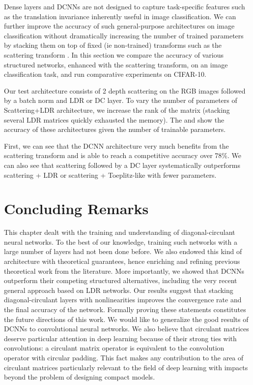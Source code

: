 Dense layers and DCNNs are not designed to capture task-specific features such as the translation invariance inherently useful in image classification.
We can further improve the accuracy of such general-purpose architectures on image classification without dramatically increasing the number of trained parameters by stacking them on top of fixed (ie non-trained) transforms such as the scattering transform \cite{mallat2010recursive}.
In this section we compare the accuracy of various structured networks, enhanced with the scattering transform, on an image classification task, and run comparative experiments on CIFAR-10. 

Our test architecture consists of 2 depth scattering on the RGB images followed by a batch norm and LDR or DC layer.
To vary the number of parameters of Scattering+LDR architecture, we increase the rank of the matrix (stacking several LDR matrices quickly exhausted the memory).
The  and  show the accuracy of these architectures given the number of trainable parameters.

First, we can see that the DCNN architecture very much benefits from the scattering transform and is able to reach a competitive accuracy over 78\%.
We can also see that scattering followed by a DC layer systematically outperforms scattering + LDR or scattering + Toeplitz-like with fewer parameters. 





\section{Concluding Remarks}
\label{section:ch4-concluding_remarks}

This chapter dealt with the training and understanding of diagonal-circulant neural networks.
To the best of our knowledge, training such networks with a large number of layers had not been done before.
We also endowed this kind of architecture with theoretical guarantees, hence enriching and refining previous theoretical work from the literature.
More importantly, we showed that DCNNs outperform their competing structured alternatives, including the very recent general approach based on LDR networks.
Our results suggest that stacking diagonal-circulant layers with nonlinearities improves the convergence rate and the final accuracy of the network.
Formally proving these statements constitutes the future directions of this work.
We would like to generalize the good results of DCNNs to convolutional neural networks.
We also believe that circulant matrices deserve particular attention in deep learning because of their strong ties with convolutions: a circulant matrix operator is equivalent to the convolution operator with circular padding.
This fact makes any contribution to the area of circulant matrices particularly relevant to the field of deep learning with impacts beyond the problem of designing compact models.

